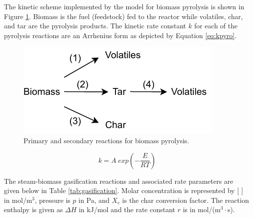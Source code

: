 \documentclass[12pt,titlepage]{article}
\begin{document}
The kinetic scheme implemented by the model for biomass pyrolysis is shown in Figure \ref{fig:pyrolysis}. Biomass is the fuel (feedstock) fed to the reactor while volatiles, char, and tar are the pyrolysis products. The kinetic rate constant $k$ for each of the pyrolysis reactions are an Arrhenius form as depicted by Equation \ref{eq:kpyro}.

\begin{figure}[ht]
    \centering
    \includegraphics{figures/pyrolysis.pdf}
    \caption{Primary and secondary reactions for biomass pyrolysis.}
    \label{fig:pyrolysis}
\end{figure}

\begin{equation}
    k = A\; exp \left( -\frac{E}{R T} \right) \label{eq:kpyro}
\end{equation}

The steam-biomass gasification reactions and associated rate parameters are given below in Table \ref{tab:gasification}. Molar concentration is represented by [ ] in mol/m$^3$, pressure is $p$ in Pa, and $X_c$ is the char conversion factor. The reaction enthalpy is given as $\Delta H$ in kJ/mol and the rate constant $r$ is in mol/(m$^3 \cdot$s).
\end{document}
